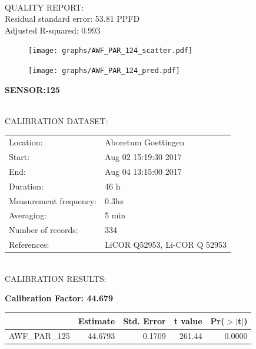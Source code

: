 \documentclass[oneside]{report}
\begin{document}
\hrulefill\\
QUALITY REPORT:\\
Residual standard error: 53.81 PPFD\\
Adjusted R-squared: 0.993



\begin{figure}[H]
  \centering
  \texttt{[image: graphs/AWF\_PAR\_124\_scatter.pdf]}
\end{figure}




\begin{figure}[H]
  \centering
  \texttt{[image: graphs/AWF\_PAR\_124\_pred.pdf]}
\end{figure}

\pagebreak


\begin{center}
\large{\textbf{SENSOR:125}}\\
\end{center}

\hrulefill\\
CALIBRATION DATASET:\\
\begin{table}[h!]
  \centering
  \label{tab:table1}
  \begin{tabular}{ll}
    Location: & Aboretum Goettingen\\ 
    
    
    Start:  & Aug 02 15:19:30 2017 \\
    End:   & Aug 04 13:15:00 2017\\ 
    Duration: & 46 h\\
    Measurement frequency: & 0.3hz\\
    Averaging:  &5 min\\
    Number of records: & 334 \\
    References: & LiCOR Q52953, Li-COR Q 52953 \\
  \end{tabular}
\end{table}

\hrulefill\\
CALIBRATION RESULTS:\\


\begin{center}
\textbf{\large{Calibration Factor: 44.679}}\\
\end{center}
\begin{table}[ht]
\centering
\begin{tabular}{rrrrr}
  \hline
 & Estimate & Std. Error & t value & Pr($>$$|$t$|$) \\ 
  \hline
AWF\_PAR\_125 & 44.6793 & 0.1709 & 261.44 & 0.0000 \\ 
   \hline
\end{tabular}
\end{table}
\end{document}
